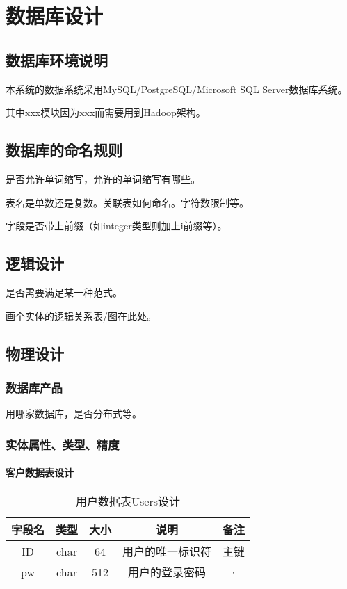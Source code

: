 \chapter{数据库设计}
\section{数据库环境说明}
本系统的数据系统采用MySQL/PostgreSQL/Microsoft SQL Server数据库系统。

其中xxx模块因为xxx而需要用到Hadoop架构。

\section{数据库的命名规则}
是否允许单词缩写，允许的单词缩写有哪些。

表名是单数还是复数。关联表如何命名。字符数限制等。

字段是否带上前缀（如integer类型则加上i前缀等）。

\section{逻辑设计}
是否需要满足某一种范式。

画个实体的逻辑关系表/图在此处。

\section{物理设计}
\subsection{数据库产品}
用哪家数据库，是否分布式等。
\subsection{实体属性、类型、精度}
\subsubsection{客户数据表设计}
\begin{table}[htbp]
\centering
\caption{用户数据表Users设计} \label{tab:client-database}
\begin{tabular}{|c|c|c|c|c|}
    \hline
    字段名 & 类型 & 大小 & 说明 & 备注 \\
    \hline
    ID & char & 64 & 用户的唯一标识符 & 主键\\
    \hline
    pw & char & 512 & 用户的登录密码 & · \\
    \hline
\end{tabular}
\end{table}

